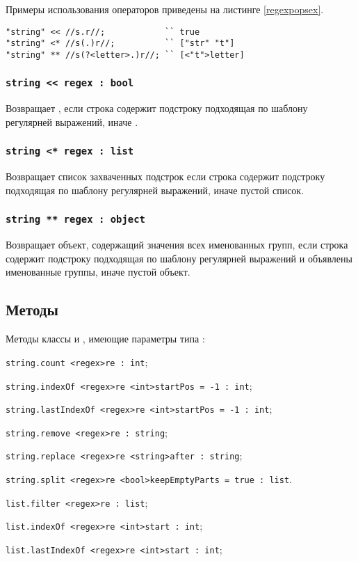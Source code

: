 Примеры использования операторов приведены на листинге \ref{regexpopsex}.

\begin{lstlisting}[caption=Операторы регулярных выражений, label=regexpopsex]
"string" << //s.r//;            `` true
"string" <* //s(.)r//;          `` ["str" "t"]
"string" ** //s(?<letter>.)r//; `` [<"t">letter]
\end{lstlisting}

\subsubsection{\lstinline|string << regex : bool|}

Возвращает \true{}, если строка содержит подстроку подходящая по шаблону регулярней выражений, иначе \false{}.

\subsubsection{\lstinline|string <* regex : list|}

Возвращает список захваченных подстрок если строка содержит подстроку подходящая по шаблону регулярней выражений, иначе пустой список.

\subsubsection{\lstinline|string ** regex : object|}

Возвращает объект, содержащий значения всех именованных групп, если строка содержит подстроку подходящая по шаблону регулярней выражений и объявлены именованные группы, иначе пустой объект.


\subsection{Методы}

Методы классы \str{} и \listtype, имеющие параметры типа \regex{}:
\begin{icItems}
\item
	\lstinline|string.count <regex>re : int|;
\item
	\lstinline|string.indexOf <regex>re <int>startPos = -1 : int|;
\item
	\lstinline|string.lastIndexOf <regex>re <int>startPos = -1 : int|;
\item
	\lstinline|string.remove <regex>re : string|;
\item 
	\lstinline|string.replace <regex>re <string>after : string|;
\item
	\lstinline|string.split <regex>re <bool>keepEmptyParts = true : list|.
\item
	\lstinline|list.filter <regex>re : list|;
\item
	\lstinline|list.indexOf <regex>re <int>start : int|;
\item
	\lstinline|list.lastIndexOf <regex>re <int>start : int|;
\end{icItems}

